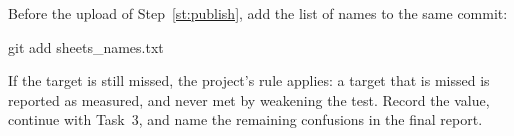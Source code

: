 Before the upload of Step~\ref{st:publish}, add the list of names to the same commit:
\begin{ps}
git add sheets\photo_names.txt
\end{ps}

\begin{note}
If the target is still missed, the project's rule applies: a target that is missed is reported
as measured, and never met by weakening the test. Record the value, continue with Task~3, and
name the remaining confusions in the final report.
\end{note}
